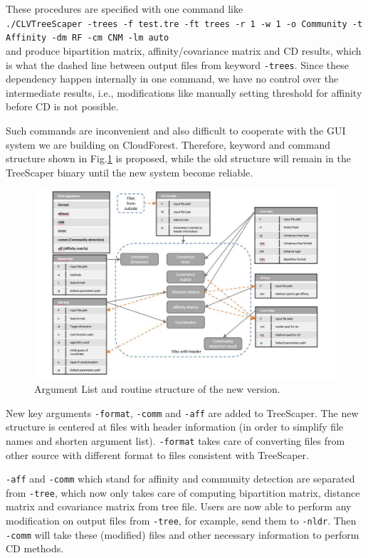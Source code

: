 \documentclass[11pt,a4paper]{article}
\theoremstyle{definition}
\theoremstyle{definition}
\numberwithin{equation}{section}
\begin{document}
	These procedures are specified with one command like\\
	\texttt{./CLVTreeScaper -trees -f test.tre -ft trees -r 1 -w 1 -o Community -t Affinity -dm RF -cm CNM -lm auto}\\
	and produce bipartition matrix, affinity/covariance matrix and CD results, which is what the dashed line between output files from keyword \texttt{-trees}. Since these dependency happen internally in one command, we have no control over the intermediate results, i.e., modifications like manually setting threshold for affinity before CD is not possible.
	
	Such commands are inconvenient and also difficult to cooperate with the GUI system we are building on CloudForest. Therefore, keyword and command structure shown in Fig.\ref{fig:argumentnew} is proposed, while the old structure will remain in the TreeScaper binary until the new system become reliable. 
	

	\begin{figure}[!h]
		\includegraphics[width=\textwidth]{ArgumentList2.jpg}
		\caption{Argument List and routine structure of the new version.}
		\label{fig:argumentnew}
	\end{figure}

	New key arguments \texttt{-format}, \texttt{-comm} and \texttt{-aff} are added to TreeScaper. The new structure is centered at files with header information (in order to simplify file names and shorten argument list). \texttt{-format} takes care of converting files from other source with different format to files consistent with TreeScaper.
	
	\texttt{-aff} and \texttt{-comm} which stand for affinity and community detection are separated from \texttt{-tree}, which now only takes care of computing bipartition matrix, distance matrix and covariance matrix from tree file. Users are now able to perform any modification on output files from \texttt{-tree}, for example, send them to \texttt{-nldr}. Then \texttt{-comm} will take these (modified) files and other necessary information to perform CD methods.
	
\end{document}
